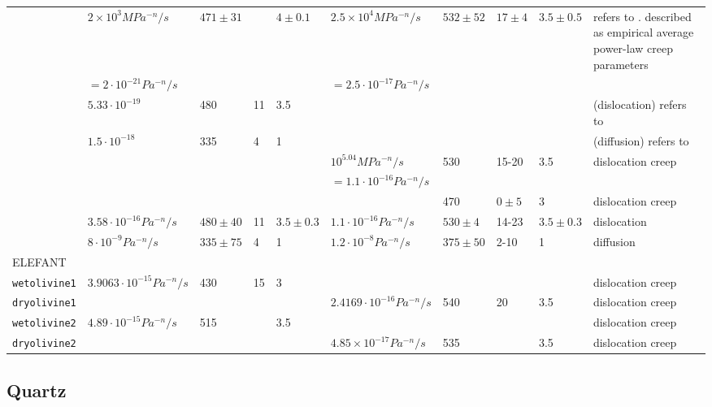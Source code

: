 \begin{tabular}{|l|llll|llll|p{4cm}|}
\cite{ranalli} &   $2\times10^3 MPa^{-n}/s$ & $471\pm31$ &  & $4\pm0.1$ & $2.5\times10^4 MPa^{-n}/s$ & $532\pm52$ & $17\pm4$  & $3.5\pm0.5$ & refers to \cite{kikr87}. described as 
empirical average power-law creep parameters\\
              & $=2\cdot10^{-21}Pa^{-n}/s$   &&&& $=2.5\cdot 10^{-17}Pa^{-n}/s$  &&&&\\
\cite{tebu12} & $5.33\cdot10^{-19}$ &  480 & 11 & 3.5 &&&&& (dislocation) refers to \cite{hiko03}\\
\cite{tebu12} & $1.5\cdot10^{-18}$ &  335 & 4 & 1 &&&&& (diffusion) refers to \cite{hiko03}\\
\hline
\cite{kako09} & &&&& $10^{5.04}MPa^{-n}/s$ & 530 & 15-20 & 3.5 & dislocation creep\\
              & &&&& $=1.1\cdot10^{-16}Pa^{-n}/s$ &&&&  \\
\cite{liwr06} & &&&&  & 470 & $0\pm5$  & 3  & dislocation creep\\
\hline
\cite{hiko03} & $3.58\cdot10^{-16}Pa^{-n}/s$& $480\pm40$& 11& $3.5\pm 0.3$& $1.1\cdot10^{-16}Pa^{-n}/s$ & $530\pm4$& 14-23 & $3.5\pm0.3$& dislocation\\
\cite{hiko03} & $8\cdot10^{-9}Pa^{-n}/s$& $335\pm75$& 4 &1  & $1.2\cdot 10^{-8}Pa^{-n}/s$& $375\pm50$ & 2-10& 1 & diffusion \\ 
\hline\hline
ELEFANT & &&&&&&&&\\
{\tt wetolivine1} & $3.9063\cdot10^{-15}Pa^{-n}/s$& 430 & 15 & 3 &&&&& dislocation creep \cite{kawu93}\\ 
{\tt dryolivine1} & &&& &$2.4169\cdot10^{-16}Pa^{-n}/s$ & 540 & 20 & 3.5 & dislocation creep \cite{kawu93}\\
{\tt wetolivine2} & $4.89\cdot10^{-15}Pa^{-n}/s$ & 515 & & 3.5  & &&&& dislocation creep \cite{hiko96}\\ 
{\tt dryolivine2} & &&& & $4.85\times10^{-17}Pa^{-n}/s$ & 535 & & 3.5 & dislocation creep \cite{hiko96}\\ 
\hline
\end{tabular}

\newpage
\subsection{Quartz}

